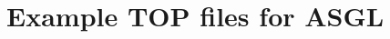 \documentclass[11pt]{article}
\begin{document}
\section{Example {\sc TOP} files for {\sc ASGL}}

  {\small
  
  }
\end{document}

